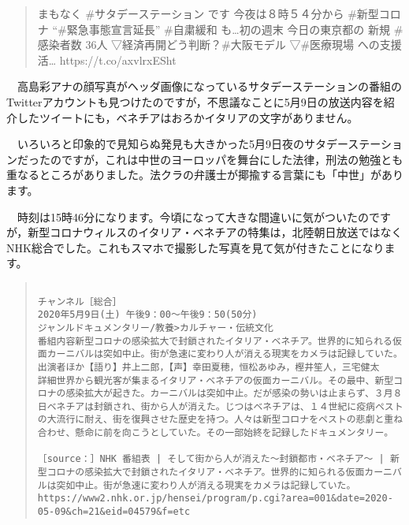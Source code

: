 \documentclass[]{ltjarticle}
\begin{document}
\begin{quote}
まもなく \#サタデーステーション です 今夜は８時５４分から \#新型コロナ
``\#緊急事態宣言延長'' \#自粛緩和 も\ldots{}初の週末 今日の東京都の 新規
\#感染者数 36人 ▽経済再開どう判断？\#大阪モデル ▽\#医療現場
への支援活\ldots{} https://t.co/axvlrxESht
\end{quote}

　高島彩アナの顔写真がヘッダ画像になっているサタデーステーションの番組のTwitterアカウントも見つけたのですが，不思議なことに5月9日の放送内容を紹介したツイートにも，ベネチアはおろかイタリアの文字がありません。

　いろいろと印象的で見知らぬ発見も大きかった5月9日夜のサタデーステーションだったのですが，これは中世のヨーロッパを舞台にした法律，刑法の勉強とも重なるところがありました。法クラの弁護士が揶揄する言葉にも「中世」があります。

　時刻は15時46分になります。今頃になって大きな間違いに気がついたのですが，新型コロナウィルスのイタリア・ベネチアの特集は，北陸朝日放送ではなくNHK総合でした。これもスマホで撮影した写真を見て気が付きたことになります。

\begingroup\fontsize{9pt}{10pt}\selectfont
\begin{quote}
\begin{verbatim}

チャンネル［総合］
2020年5月9日(土) 午後9：00～午後9：50(50分)
ジャンルドキュメンタリー/教養>カルチャー・伝統文化
番組内容新型コロナの感染拡大で封鎖されたイタリア・ベネチア。世界的に知られる仮面カーニバルは突如中止。街が急速に変わり人が消える現実をカメラは記録していた。
出演者ほか【語り】井上二郎，【声】幸田夏穂，恒松あゆみ，樫井笙人，三宅健太
詳細世界から観光客が集まるイタリア・ベネチアの仮面カーニバル。その最中、新型コロナの感染拡大が起きた。カーニバルは突如中止。だが感染の勢いは止まらず、３月８日ベネチアは封鎖され、街から人が消えた。じつはベネチアは、１４世紀に疫病ペストの大流行に耐え、街を復興させた歴史を持つ。人々は新型コロナをペストの悲劇と重ね合わせ、懸命に前を向こうとしていた。その一部始終を記録したドキュメンタリー。

［source：］NHK 番組表 | そして街から人が消えた～封鎖都市・ベネチア～ | 新型コロナの感染拡大で封鎖されたイタリア・ベネチア。世界的に知られる仮面カーニバルは突如中止。街が急速に変わり人が消える現実をカメラは記録していた。 https://www2.nhk.or.jp/hensei/program/p.cgi?area=001&date=2020-05-09&ch=21&eid=04579&f=etc

\end{verbatim}
\end{quote}\endgroup
\end{document}
